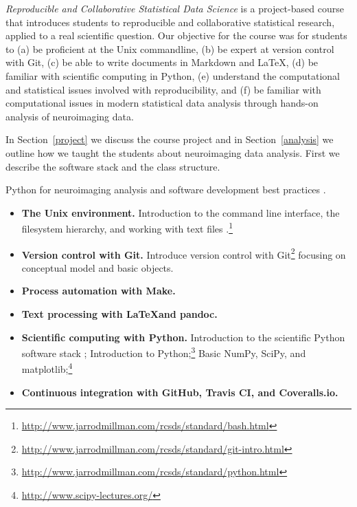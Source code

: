 \emph{Reproducible and Collaborative Statistical Data Science} is a
project-based course that introduces students to reproducible and collaborative
statistical research, applied to a real scientific question.
Our objective for the course was for students to
(a) be proficient at the Unix commandline,
(b) be expert at version control with Git,
(c) be able to write documents in Markdown and \LaTeX,
(d) be familiar with scientific computing in Python,
(e) understand the computational and statistical issues involved with reproducibility, and
(f) be familiar with computational issues in modern statistical data
analysis through hands-on analysis of neuroimaging data.


In Section~\ref{project} we discuss the course project and
in Section~\ref{analysis} we outline how we taught the
students about neuroimaging data analysis.
First we describe the software stack and the class structure.

Python for neuroimaging analysis \citep{millman2007analysis} and
software development best practices \citep{millman2014developing}.

\begin{itemize}
\item \textbf{The Unix environment.}
Introduction to the command line interface, the filesystem hierarchy, and
working with text files
\citep{preeyanon2014reproducible}.\footnote{\url{http://www.jarrodmillman.com/rcsds/standard/bash.html}}

\item \textbf{Version control with Git.}
Introduce version control with
Git\footnote{\url{http://www.jarrodmillman.com/rcsds/standard/git-intro.html}}
focusing on conceptual model and basic objects.

\item \textbf{Process automation with Make.}

\item \textbf{Text processing with \LaTeX and pandoc.}

\item \textbf{Scientific computing with Python.}
Introduction to the scientific Python software stack
\citep{millman2011python, perez2011python};
Introduction to Python;\footnote{\url{http://www.jarrodmillman.com/rcsds/standard/python.html}}
Basic NumPy, SciPy, and matplotlib;\footnote{\url{http://www.scipy-lectures.org/}}

\item \textbf{Continuous integration with GitHub, Travis CI, and Coveralls.io.}

\end{itemize}

